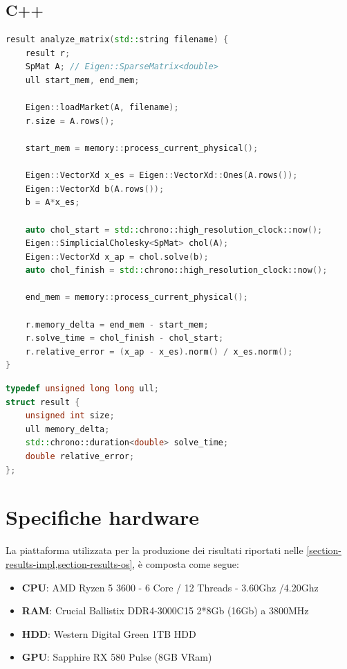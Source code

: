\documentclass[11pt,italian]{article}
\begin{document}
\subsection{C++}
\begin{lstlisting}[language=C++,emph={result,SpMat,Eigen,int,std},caption=C++: Algoritmo principale,label=fig:code-cpp-algo]
result analyze_matrix(std::string filename) {
    result r;
    SpMat A; // Eigen::SparseMatrix<double>
    ull start_mem, end_mem;

    Eigen::loadMarket(A, filename);
    r.size = A.rows();

    start_mem = memory::process_current_physical();

    Eigen::VectorXd x_es = Eigen::VectorXd::Ones(A.rows());
    Eigen::VectorXd b(A.rows());
    b = A*x_es;

    auto chol_start = std::chrono::high_resolution_clock::now();
    Eigen::SimplicialCholesky<SpMat> chol(A);
    Eigen::VectorXd x_ap = chol.solve(b);
    auto chol_finish = std::chrono::high_resolution_clock::now();

    end_mem = memory::process_current_physical();

    r.memory_delta = end_mem - start_mem;
    r.solve_time = chol_finish - chol_start;
    r.relative_error = (x_ap - x_es).norm() / x_es.norm();
}
\end{lstlisting}

\begin{lstlisting}[language=C++,emph={ull,std},caption=C++: Algoritmo principale,label=fig:code-cpp-algo]
typedef unsigned long long ull;
struct result {
    unsigned int size;
    ull memory_delta;
    std::chrono::duration<double> solve_time;
    double relative_error;
};
\end{lstlisting}

\newpage
\section{Specifiche hardware}
La piattaforma utilizzata per la produzione dei risultati riportati nelle \cref{section-results-impl,section-results-os}, è composta come segue:
\begin{itemize}
    \item \textbf{CPU}: AMD Ryzen 5 3600 - 6 Core / 12 Threads - 3.60Ghz /4.20Ghz
    \item \textbf{RAM}: Crucial Ballistix DDR4-3000C15 2*8Gb (16Gb) a 3800MHz
    \item \textbf{HDD}: Western Digital Green 1TB HDD
    \item \textbf{GPU}: Sapphire RX 580 Pulse (8GB VRam)
\end{itemize}
\end{document}
